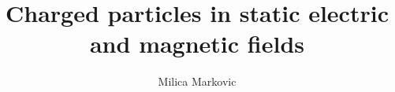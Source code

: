 \documentclass{ximera}
\title{Charged particles in static electric and magnetic fields}
\author{Milica Markovic}
\begin{document}
  
\begin{abstract}  

\end{abstract}  
\maketitle    
\end{document}
